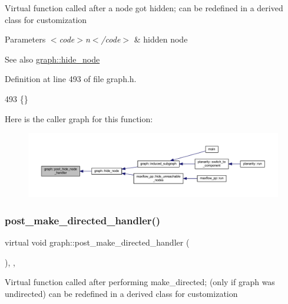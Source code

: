 Virtual function called after a node got hidden; can be redefined in a derived class for customization


\begin{DoxyParams}{Parameters}
{\em $<$code$>$n$<$/code$>$} & hidden node \\
\hline
\end{DoxyParams}
\begin{DoxySeeAlso}{See also}
\mbox{\hyperlink{classgraph_a214618b5e3c02695779350532506e225}{graph\+::hide\+\_\+node}} 
\end{DoxySeeAlso}


Definition at line 493 of file graph.\+h.


\begin{DoxyCode}
493 \{\}         
\end{DoxyCode}
Here is the caller graph for this function\+:
\nopagebreak
\begin{figure}[H]
\begin{center}
\leavevmode
\includegraphics[width=350pt]{classgraph_a50cb72a1e81d0a3d68965a1e6070edb3_icgraph}
\end{center}
\end{figure}
\mbox{\label{classgraph_a43dc35def3d8125eb8f3841d55e0b1c8}} 
\subsubsection{\texorpdfstring{post\+\_\+make\+\_\+directed\+\_\+handler()}{post\_make\_directed\_handler()}}
{\footnotesize\ttfamily virtual void graph\+::post\+\_\+make\+\_\+directed\+\_\+handler (\begin{DoxyParamCaption}{ }\end{DoxyParamCaption})\hspace{0.3cm}{\ttfamily [inline]}, {\ttfamily [virtual]}, {\ttfamily [inherited]}}

Virtual function called after performing make\+\_\+directed; (only if graph was undirected) can be redefined in a derived class for customization

